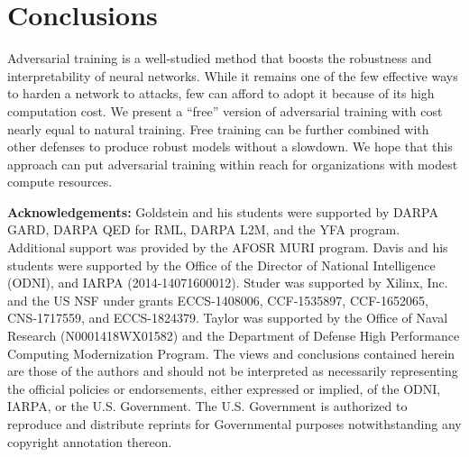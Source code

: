 \documentclass{article}
\begin{document}
\section{Conclusions}
Adversarial training is a well-studied method that boosts the robustness and interpretability of neural networks. While it remains one of the few effective ways to harden a network to attacks, few can afford to adopt it because of its high computation cost. We present a ``free'' version of adversarial training with cost nearly equal to natural training. Free training can be further combined with other defenses to produce robust models without a slowdown. We hope that this approach can put adversarial training within reach for organizations with modest compute resources.

\textbf{Acknowledgements:}
Goldstein and his students were supported by DARPA GARD, DARPA QED for RML, DARPA L2M, and the YFA program. Additional support was provided by the AFOSR MURI program. Davis and his students were supported by the Office of the Director of National Intelligence (ODNI), and IARPA (2014-14071600012). Studer was supported by Xilinx, Inc. and the US NSF under grants ECCS-1408006, CCF-1535897,  CCF-1652065, CNS-1717559, and ECCS-1824379.
Taylor was supported by the Office of Naval Research (N0001418WX01582) and the Department of Defense High Performance Computing Modernization Program.  The views and conclusions contained herein are those of the authors and should not be interpreted as necessarily representing the official policies or endorsements, either expressed or implied, of the ODNI, IARPA, or the U.S. Government. The U.S. Government is authorized to reproduce and distribute reprints for Governmental purposes notwithstanding any copyright annotation thereon.




\FloatBarrier

\end{document}
